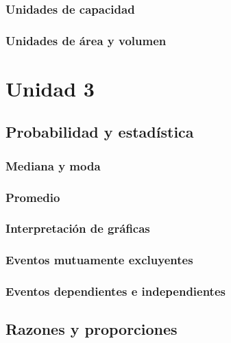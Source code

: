 \documentclass[12pt,addpoints]{evalua3}
\begin{document}
\begin{questions}
	\subsubsection{Unidades de capacidad}
	\question{}
	\subsubsection{Unidades de área y volumen}
	\question{}

	\section{Unidad 3}
	\subsection   {Probabilidad y estadística}
	\subsubsection{Mediana y moda}
	\question{}
	\subsubsection{Promedio}
	\question{}
	\subsubsection{Interpretación de gráficas}
	\question{}
	\subsubsection{Eventos mutuamente excluyentes}
	\question{}
	\subsubsection{Eventos dependientes e independientes}
	\question{}
	\subsection   {Razones y proporciones}

\end{questions}
\end{document}
